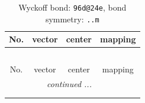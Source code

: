 \documentclass[fleqn,8pt]{jsarticle}
\begin{document}
\renewcommand{\arraystretch}{1.2}
\begin{longtable}{cccc}
\caption{Wyckoff bond: {\tt 96d@24e}, bond symmetry: {\tt ..m}}
 \\
 \hline \hline
No. & vector & center & mapping \\ \hline \endfirsthead

\multicolumn{3}{l}{\tablename\ \thetable{}} \\
 \hline \hline
No. & vector & center & mapping \\ \hline \endhead

 \hline \hline
\multicolumn{3}{r}{\footnotesize\it continued ...} \\ \endfoot

 \hline \hline
\multicolumn{3}{r}{} \\ \endlastfoot


\end{longtable}
\end{document}
